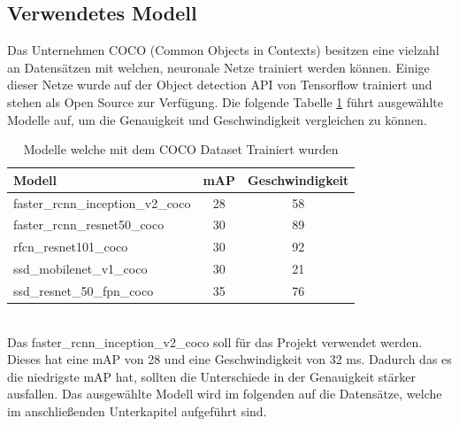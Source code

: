 \documentclass[a4paper,12pt,oneside]{article}
\begin{document}
 \subsection{Verwendetes Modell}\label{s.modell}
Das Unternehmen COCO \cite{common2018data} (Common Objects in Contexts) besitzen eine vielzahl an Datensätzen mit welchen, neuronale Netze trainiert werden können. Einige dieser Netze wurde auf der Object detection API von Tensorflow trainiert und stehen als Open Source zur Verfügung. Die folgende Tabelle \ref{tab:cocomodels} führt ausgewählte Modelle auf, um die Genauigkeit und Geschwindigkeit vergleichen zu können.\\
\begin{table}
[h]
\caption{Modelle \cite{google2018tens} welche mit dem COCO Dataset Trainiert wurden \cite{common2018data}}
\label{tab:cocomodels}
\centering
\begin{tabular}{|l|c|c|}
\hline
Modell & mAP & Geschwindigkeit\\
\hline
faster\_rcnn\_inception\_v2\_coco & 28 & 58\\
faster\_rcnn\_resnet50\_coco & 30 & 89\\
rfcn\_resnet101\_coco & 30 & 92\\
ssd\_mobilenet\_v1\_coco & 30 & 21\\
ssd\_resnet\_50\_fpn\_coco & 35 & 76\\
\hline
\end{tabular}
\end{table}\\
Das faster\_rcnn\_inception\_v2\_coco soll für das Projekt verwendet werden. Dieses hat eine mAP von 28 und eine Geschwindigkeit von 32 ms. Dadurch das es die niedrigste mAP hat, sollten die Unterschiede in der Genauigkeit stärker ausfallen. Das ausgewählte Modell wird im folgenden auf die Datensätze, welche im anschließenden Unterkapitel aufgeführt sind.
\end{document}
